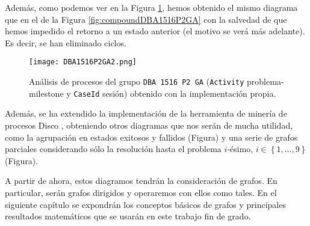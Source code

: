 Además, como podemos ver en la Figura \ref{fig:DBA1516P2GA2}, hemos obtenido el mismo diagrama que en el de la Figura \ref{fig:compoundDBA1516P2GA} con la salvedad de que hemos impedido el retorno a un estado anterior (el motivo se verá más adelante). Es decir, se han eliminado ciclos.

\begin{figure}[H]
    \centering
    \texttt{[image: DBA1516P2GA2.png]}
    \caption{Análisis de procesos del grupo \texttt{DBA 1516 P2 GA} (\texttt{Activity} problema-milestone y \texttt{CaseId} sesión) obtenido con la implementación propia.}
    \label{fig:DBA1516P2GA2}
\end{figure}

Además, se ha extendido la implementación de la herramienta de minería de procesos Disco \cite{gunther2012disco}, obteniendo otros diagramas que nos serán de mucha utilidad, como la agrupación en estados exitosos y fallidos (Figura) y una serie de grafos parciales considerando sólo la resolución hasta el problema $i$-ésimo, $i \in \left\lbrace 1,\dots,9 \right\rbrace$ (Figura).

A partir de ahora, estos diagramos tendrán la consideración de grafos. En particular, serán grafos dirigidos y operaremos con ellos como tales. En el siguiente capítulo se expondrán los conceptos básicos de grafos y principales resultados matemáticos que se usarán en este trabajo fin de grado.